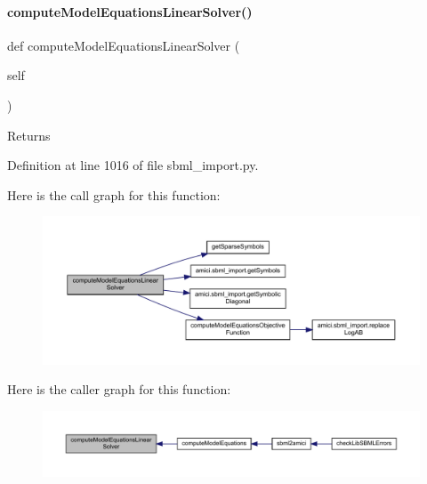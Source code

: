 \paragraph{\texorpdfstring{compute\+Model\+Equations\+Linear\+Solver()}{computeModelEquationsLinearSolver()}}
{\footnotesize\ttfamily def compute\+Model\+Equations\+Linear\+Solver (\begin{DoxyParamCaption}\item[{}]{self }\end{DoxyParamCaption})}

\begin{DoxyReturn}{Returns}

\end{DoxyReturn}


Definition at line 1016 of file sbml\+\_\+import.\+py.

Here is the call graph for this function\+:
\nopagebreak
\begin{figure}[H]
\begin{center}
\leavevmode
\includegraphics[width=350pt]{classamici_1_1sbml__import_1_1_sbml_importer_a8d851cd7e0fd6f00e3c85e615de3f796_cgraph}
\end{center}
\end{figure}
Here is the caller graph for this function\+:
\nopagebreak
\begin{figure}[H]
\begin{center}
\leavevmode
\includegraphics[width=350pt]{classamici_1_1sbml__import_1_1_sbml_importer_a8d851cd7e0fd6f00e3c85e615de3f796_icgraph}
\end{center}
\end{figure}
\mbox{\label{classamici_1_1sbml__import_1_1_sbml_importer_a0912a62ab201e0bb9b4ecb5c42894398}} 
